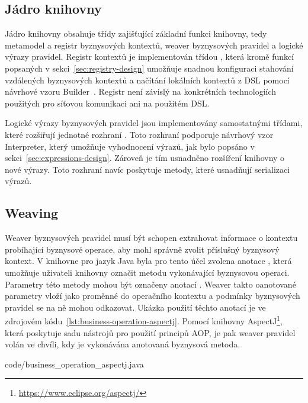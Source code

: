 \subsection{Jádro knihovny}

Jádro knihovny obsahuje třídy zajišťující základní funkci knihovny, tedy metamodel a registr
byznysových kontextů, weaver byznysových pravidel a logické výrazy pravidel. Registr kontextů
je implementován třídou , která kromě funkcí popsaných v
sekci~\ref{sec:registry-design} umožňuje snadnou konfiguraci
stahování vzdálených byznysových kontextů a načítání lokálních kontextů z \gls{DSL} pomocí
návrhové vzoru Builder~\cite{fowler2002patterns}. Registr není závislý na konkrétních
technologiích použitých pro síťovou komunikaci ani na použitém \gls{DSL}.

Logické výrazy byznysových pravidel jsou implementovány samostatnými třídami, které rozšiřují
jednotné rozhraní . Toto rozhraní podporuje návrhový vzor Interpreter, který umožňuje
vyhodnocení výrazů, jak bylo popsáno v sekci~\ref{sec:expressions-design}. Zároveň je tím usnadněno
rozšíření knihovny o nové výrazy. Toto rozhraní navíc poskytuje metody, které usnadňují serializaci
výrazů.

\subsection{Weaving}

Weaver byznysových pravidel musí být schopen extrahovat informace o kontextu probíhající byznysové
operace, aby mohl správně zvolit příslušný byznysový kontext. V knihovne pro jazyk Java
byla pro tento účel zvolena anotace , která umožňuje uživateli
knihovny označit metodu vykonávající byznysovou operaci. Parametry této metody mohou být
označeny anotací . Weaver takto oanotované parametry vloží
jako proměnné do operačního kontextu a podmínky byznysových pravidel se na ně mohou odkazovat.
Ukázka použití těchto anotací je ve zdrojovém kódu~\ref{lst:business-operation-aspectj}.
Pomocí knihovny AspectJ\footnote{\url{https://www.eclipse.org/aspectj/}}, která poskytuje sadu nástrojů pro použití principů \gls{AOP},
je pak weaver pravidel volán ve chvíli, kdy je vykonávána anotovaná byznysová metoda.


{code/business_operation_aspectj.java}

